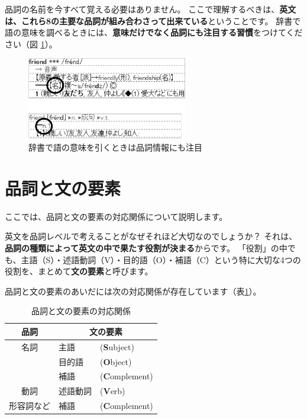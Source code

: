 \documentclass[12pt,titlepage]{jsarticle}
\begin{document}
 品詞の名前を今すべて覚える必要はありません。
 ここで理解するべきは、{\bf 英文は、これら8の主要な品詞が組み合わさって出来ている}ということです。
 辞書で語の意味を調べるときには、{\bf 意味だけでなく品詞にも注目する習慣}をつけてください（図 \ref{fig3}）。
  \begin{figure}[htbp]
   \begin{center}
    \includegraphics[width=7cm]{./figure/fig3.pdf}
    \caption{辞書で語の意味を引くときは品詞情報にも注目}
    \label{fig3}
   \end{center}
  \end{figure}


 \section{品詞と文の要素}
 ここでは、品詞と文の要素の対応関係について説明します。

 英文を品詞レベルで考えることがなぜそれほど大切なのでしょうか？
 それは、{\bf 品詞の種類によって英文の中で果たす役割が決まる}からです。
 「役割」の中でも、主語（S）・述語動詞（V）・目的語（O）・補語（C）という特に大切な4つの役割を、まとめて{\bf 文の要素}と呼びます。

 品詞と文の要素のあいだには次の対応関係が存在しています（表\ref{tab1}）。
 \begin{table}[htbp]
  \begin{center}
   \caption{品詞と文の要素の対応関係}
   \begin{tabular}{|c|ll|}
    \hline
    品詞 & \multicolumn{2}{|c|}{文の要素} \\ \hline \hline
    名詞 & 主語 & ({\bf S}ubject) \\ 
    & 目的語 & ({\bf O}bject) \\
    & 補語 & ({\bf C}omplement) \\ \hline
    動詞 & 述語動詞 & ({\bf V}erb) \\ \hline
    形容詞など & 補語 & ({\bf C}omplement) \\ \hline
   \end{tabular}
   \label{tab1}
  \end{center}
 \end{table}
 
\end{document}
